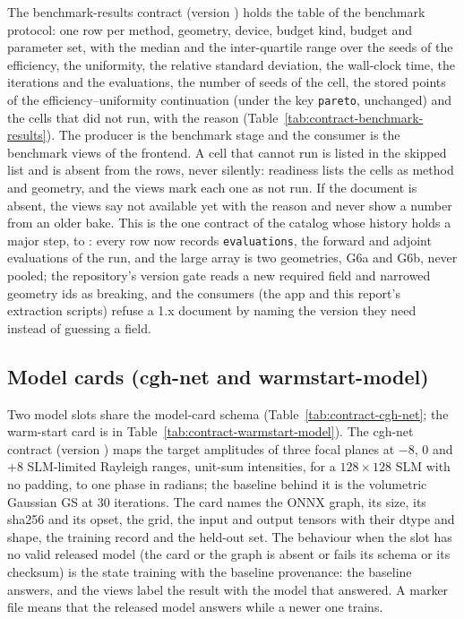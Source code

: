 The benchmark-results contract (version ) holds the table of the benchmark protocol: one row per method, geometry, device, budget kind, budget and parameter set, with the median and the inter-quartile range over the seeds of the efficiency, the uniformity, the relative standard deviation, the wall-clock time, the iterations and the evaluations, the number of seeds of the cell, the stored points of the efficiency--uniformity continuation (under the key \texttt{pareto}, unchanged) and the cells that did not run, with the reason (Table~\ref{tab:contract-benchmark-results}). The producer is the benchmark stage and the consumer is the benchmark views of the frontend. A cell that cannot run is listed in the skipped list and is absent from the rows, never silently: readiness lists the cells as method and geometry, and the views mark each one as not run. If the document is absent, the views say not available yet with the reason and never show a number from an older bake. This is the one contract of the catalog whose history holds a major step, to : every row now records \texttt{evaluations}, the forward and adjoint evaluations of the run, and the large array is two geometries, G6a and G6b, never pooled; the repository's version gate reads a new required field and narrowed geometry ids as breaking, and the consumers (the app and this report's extraction scripts) refuse a 1.x document by naming the version they need instead of guessing a field.



\subsection{Model cards (cgh-net and warmstart-model)}\label{sec:data-cgh-net}

Two model slots share the model-card schema (Table~\ref{tab:contract-cgh-net}; the warm-start card is in Table~\ref{tab:contract-warmstart-model}). The cgh-net contract (version ) maps the target amplitudes of three focal planes at $-8$, $0$ and $+8$ SLM-limited Rayleigh ranges, unit-sum intensities, for a $128\times128$ SLM with no padding, to one phase in radians; the baseline behind it is the volumetric Gaussian GS at 30 iterations. The card names the ONNX graph, its size, its sha256 and its opset, the grid, the input and output tensors with their dtype and shape, the training record and the held-out set. The behaviour when the slot has no valid released model (the card or the graph is absent or fails its schema or its checksum) is the state training with the baseline provenance: the baseline answers, and the views label the result with the model that answered. A marker file means that the released model answers while a newer one trains.

